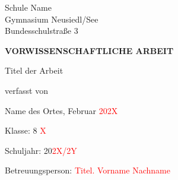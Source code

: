 \thispagestyle{empty}
\phantom{.}

\vspace{21.3mm}

\begin{center}
    Schule Name\\
    \vspace{1mm}
    Gymnasium Neusiedl/See\\
\vspace{1mm}
Bundesschulstraße 3

\vspace{21mm}

{\fontsize{20}{24}\selectfont \textbf{VORWISSENSCHAFTLICHE ARBEIT}}


\vspace{21.6mm}
Titel der Arbeit
\begin{Large}

    \textcolor{red}{{{{\fontsize{20}{24}\selectfont{Titel der VWA}}}}}

\end{Large}

\vspace{29.1mm}
verfasst von\\

\vspace{5.5mm}
\begin{Large}
\textcolor{red}{{\fontsize{20}{24}\selectfont{Vorname Nachname}}}
\end{Large}
\end{center}
\begin{small}
    

\vspace{29.3mm}
Name des Ortes, Februar \textcolor{red}{202X}

\vspace{0.75mm}
Klasse: 8 \textcolor{red}{X}

\vspace{0.73mm}
Schuljahr: 20\textcolor{red}{2X/2Y}

\vspace{0.73mm}
Betreuungsperson: \textcolor{red}{Titel. Vorname Nachname}
\end{small}